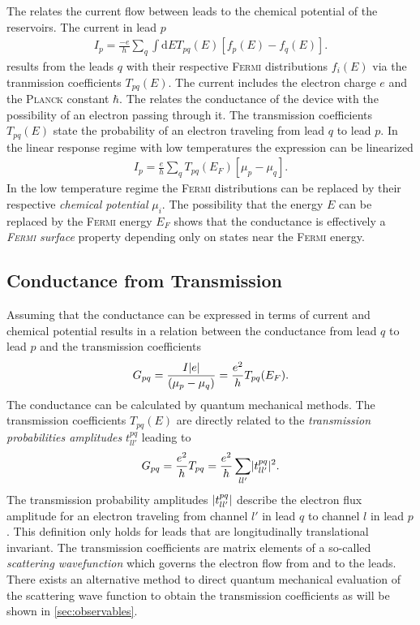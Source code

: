 The \lanbform{} relates the current flow between leads to the chemical potential of the reservoirs. The current in lead $p$ \cite{PhysRevLett.68.2512}
\begin{align}
I_p=\frac{-e}{h} \sum_q \int \text{d}E T_{pq}(E) [f_p(E) - f_q(E)].
\label{eqn:current}
\end{align}
results from the leads $q$ with their respective \textsc{Fermi} distributions $f_i(E)$ via the tranmission coefficients $T_{pq}(E)$. The current includes the electron charge $e$ and the \textsc{Planck} constant $\hbar$. The \lanbform{} relates the conductance of the device with the possibility of an electron passing through it. The transmission coefficients $T_{pq}(E)$ state the probability of an electron traveling from lead $q$ to lead $p$. 
In the linear response regime with low temperatures the expression can be linearized 
\begin{align}
I_p=\frac{e}{h} \sum_q T_{pq}(E_F) [\mu_p - \mu_q].
\label{eqn:currentlin}
\end{align}
In the low temperature regime the \textsc{Fermi} distributions can be replaced by their respective \emph{chemical potential} $\mu_i$. The possibility that the energy $E$ can be replaced by the \textsc{Fermi} energy $E_F$ shows that the conductance is effectively a \emph{\textsc{Fermi} surface} property depending only on states near the \textsc{Fermi} energy.
\subsection{Conductance from Transmission}\label{sec:conductancefromtransmission}
Assuming that the conductance can be expressed in terms of current and chemical potential results in a relation between the conductance from lead $q$ to lead $p$ and the transmission coefficients 
\begin{align}
G_{pq}=\frac{I\lvert e\rvert}{(\mu_p - \mu_q)}=\frac{e^2}{h} T_{pq}(E_F).
\label{eqn:conductance}
\end{align}
The conductance can be calculated by quantum mechanical methods. The transmission coefficients $T_{pq}(E)$ are directly related to the \emph{transmission probabilities amplitudes} $t^{pq}_{ll'}$ leading to
\begin{align}
G_{pq}=\frac{e^2}{h} T_{pq} =\frac{e^2}{h} \sum_{ll'} \lvert t^{pq}_{ll'}\rvert^2.
\label{eqn:transcoeff}
\end{align}
The transmission probability amplitudes $\lvert t^{pq}_{ll'}\rvert$ describe the electron flux amplitude for an electron traveling from channel $l'$ in lead $q$ to channel $l$ in lead $p$. This definition only holds for leads that are longitudinally translational invariant. The transmission coefficients are matrix elements of a so-called \emph{scattering wavefunction} which governs the electron flow from and to the leads\cite{Datta1997}. There exists an alternative method to direct quantum mechanical evaluation of the scattering wave function to obtain the transmission coefficients as will be shown in \cref{sec:observables}.
